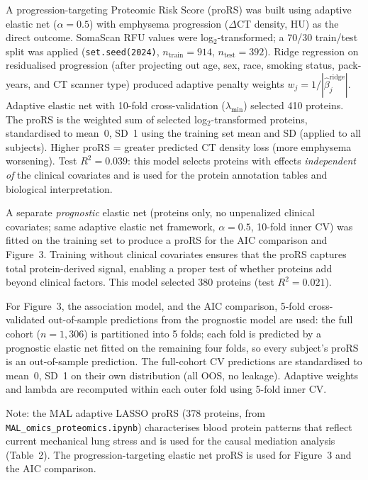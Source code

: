 \documentclass[11pt, letterpaper]{article}
\begin{document}
A progression-targeting Proteomic Risk Score (proRS) was built using
adaptive elastic net ($\alpha = 0.5$) with emphysema progression
($\Delta$CT density, HU) as the direct outcome. SomaScan RFU values were
log$_2$-transformed; a 70/30 train/test split was applied
(\texttt{set.seed(2024)}, $n_{\text{train}} = 914$,
$n_{\text{test}} = 392$). Ridge regression on residualised progression
(after projecting out age, sex, race, smoking status, pack-years, and CT
scanner type) produced adaptive penalty weights
$w_j = 1/|\hat\beta^{\text{ridge}}_j|$. Adaptive elastic net with 10-fold
cross-validation ($\lambda_{\min}$) selected 410 proteins. The proRS is
the weighted sum of selected log$_2$-transformed proteins, standardised
to mean~0, SD~1 using the training set mean and SD (applied to all
subjects). Higher proRS = greater predicted CT density loss (more
emphysema worsening). Test $R^2 = 0.039$: this model selects proteins
with effects \textit{independent of} the clinical covariates and is used
for the protein annotation tables and biological interpretation.

A separate \textit{prognostic} elastic net (proteins only, no
unpenalized clinical covariates; same adaptive elastic net framework,
$\alpha = 0.5$, 10-fold inner CV) was fitted on the training set to
produce a proRS for the AIC comparison and Figure~3. Training without
clinical covariates ensures that the proRS captures total protein-derived
signal, enabling a proper test of whether proteins add beyond clinical
factors. This model selected 380 proteins (test $R^2 = 0.021$).

For Figure~3, the association model, and the AIC comparison, 5-fold
cross-validated out-of-sample predictions from the prognostic model
are used: the full cohort ($n = 1{,}306$) is partitioned into 5 folds;
each fold is predicted by a prognostic elastic net fitted on the
remaining four folds, so every subject's proRS is an out-of-sample
prediction. The full-cohort CV predictions are standardised to mean~0,
SD~1 on their own distribution (all OOS, no leakage). Adaptive weights
and lambda are recomputed within each outer fold using 5-fold inner CV.

Note: the MAL adaptive LASSO proRS (378 proteins, from
\texttt{MAL\_omics\_proteomics.ipynb}) characterises blood protein
patterns that reflect current mechanical lung stress and is used for
the causal mediation analysis (Table~2). The progression-targeting
elastic net proRS is used for Figure~3 and the AIC comparison.

\end{document}
